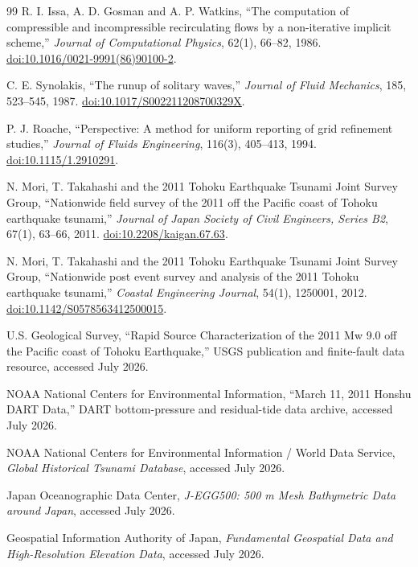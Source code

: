 \documentclass[11pt,a4paper]{article}
\begin{document}
\begin{thebibliography}{99}
R. I. Issa, A. D. Gosman and A. P. Watkins,
``The computation of compressible and incompressible recirculating flows by a non-iterative implicit scheme,''
\emph{Journal of Computational Physics}, 62(1), 66--82, 1986.
\href{https://doi.org/10.1016/0021-9991(86)90100-2}{doi:10.1016/0021-9991(86)90100-2}.

C. E. Synolakis,
``The runup of solitary waves,''
\emph{Journal of Fluid Mechanics}, 185, 523--545, 1987.
\href{https://doi.org/10.1017/S002211208700329X}{doi:10.1017/S002211208700329X}.

P. J. Roache,
``Perspective: A method for uniform reporting of grid refinement studies,''
\emph{Journal of Fluids Engineering}, 116(3), 405--413, 1994.
\href{https://doi.org/10.1115/1.2910291}{doi:10.1115/1.2910291}.

N. Mori, T. Takahashi and the 2011 Tohoku Earthquake Tsunami Joint Survey Group,
``Nationwide field survey of the 2011 off the Pacific coast of Tohoku earthquake tsunami,''
\emph{Journal of Japan Society of Civil Engineers, Series B2}, 67(1), 63--66, 2011.
\href{https://doi.org/10.2208/kaigan.67.63}{doi:10.2208/kaigan.67.63}.

N. Mori, T. Takahashi and the 2011 Tohoku Earthquake Tsunami Joint Survey Group,
``Nationwide post event survey and analysis of the 2011 Tohoku earthquake tsunami,''
\emph{Coastal Engineering Journal}, 54(1), 1250001, 2012.
\href{https://doi.org/10.1142/S0578563412500015}{doi:10.1142/S0578563412500015}.

U.S. Geological Survey,
``Rapid Source Characterization of the 2011 Mw 9.0 off the Pacific coast of Tohoku Earthquake,''
USGS publication and finite-fault data resource, accessed July 2026.

NOAA National Centers for Environmental Information,
``March 11, 2011 Honshu DART Data,''
DART bottom-pressure and residual-tide data archive, accessed July 2026.

NOAA National Centers for Environmental Information / World Data Service,
\emph{Global Historical Tsunami Database}, accessed July 2026.

Japan Oceanographic Data Center,
\emph{J-EGG500: 500 m Mesh Bathymetric Data around Japan}, accessed July 2026.

Geospatial Information Authority of Japan,
\emph{Fundamental Geospatial Data and High-Resolution Elevation Data}, accessed July 2026.

\end{thebibliography}
\end{document}
